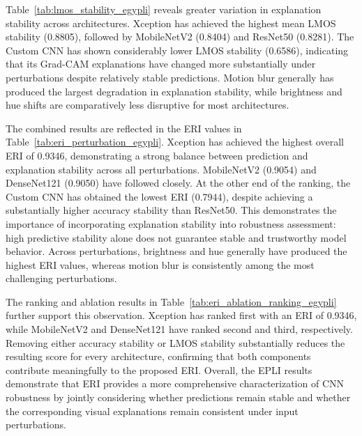 \documentclass[a4paper,fleqn]{cas-dc}
\begin{document}
Table~\ref{tab:lmos_stability_egypli} reveals greater variation in explanation stability across architectures. Xception has achieved the highest mean LMOS stability (0.8805), followed by MobileNetV2 (0.8404) and ResNet50 (0.8281). The Custom CNN has shown considerably lower LMOS stability (0.6586), indicating that its Grad-CAM explanations have changed more substantially under perturbations despite relatively stable predictions. Motion blur generally has produced the largest degradation in explanation stability, while brightness and hue shifts are comparatively less disruptive for most architectures.

The combined results are reflected in the ERI values in Table~\ref{tab:eri_perturbation_egypli}. Xception has achieved the highest overall ERI of 0.9346, demonstrating a strong balance between prediction and explanation stability across all perturbations. MobileNetV2 (0.9054) and DenseNet121 (0.9050) have followed closely. At the other end of the ranking, the Custom CNN has obtained the lowest ERI (0.7944), despite achieving a substantially higher accuracy stability than ResNet50. This demonstrates the importance of incorporating explanation stability into robustness assessment: high predictive stability alone does not guarantee stable and trustworthy model behavior. Across perturbations, brightness and hue generally have produced the highest ERI values, whereas motion blur is consistently among the most challenging perturbations.

The ranking and ablation results in Table~\ref{tab:eri_ablation_ranking_egypli} further support this observation. Xception has ranked first with an ERI of 0.9346, while MobileNetV2 and DenseNet121 have ranked second and third, respectively. Removing either accuracy stability or LMOS stability substantially reduces the resulting score for every architecture, confirming that both components contribute meaningfully to the proposed ERI. Overall, the EPLI results demonstrate that ERI provides a more comprehensive characterization of CNN robustness by jointly considering whether predictions remain stable and whether the corresponding visual explanations remain consistent under input perturbations.
\end{document}
